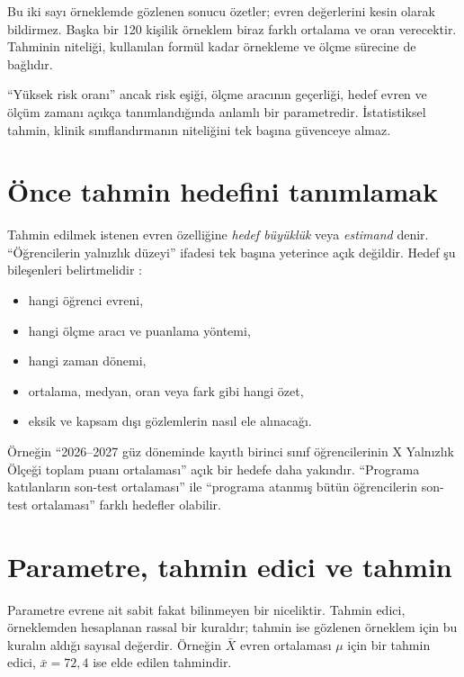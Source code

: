Bu iki sayı örneklemde gözlenen sonucu özetler; evren değerlerini kesin olarak
bildirmez. Başka bir 120 kişilik örneklem biraz farklı ortalama ve oran
verecektir. Tahminin niteliği, kullanılan formül kadar örnekleme ve ölçme
sürecine de bağlıdır.

\begin{researchbox}
``Yüksek risk oranı'' ancak risk eşiği, ölçme aracının geçerliği, hedef evren
ve ölçüm zamanı açıkça tanımlandığında anlamlı bir parametredir. İstatistiksel
tahmin, klinik sınıflandırmanın niteliğini tek başına güvenceye almaz.
\end{researchbox}

\section{Önce tahmin hedefini tanımlamak}

Tahmin edilmek istenen evren özelliğine \emph{hedef büyüklük} veya
\emph{estimand} denir. ``Öğrencilerin yalnızlık düzeyi'' ifadesi tek başına
yeterince açık değildir. Hedef şu bileşenleri belirtmelidir
\cite{casella2002,hogg2019}:

\begin{itemize}
  \item hangi öğrenci evreni,
  \item hangi ölçme aracı ve puanlama yöntemi,
  \item hangi zaman dönemi,
  \item ortalama, medyan, oran veya fark gibi hangi özet,
  \item eksik ve kapsam dışı gözlemlerin nasıl ele alınacağı.
\end{itemize}

Örneğin ``2026--2027 güz döneminde kayıtlı birinci sınıf öğrencilerinin X
Yalnızlık Ölçeği toplam puanı ortalaması'' açık bir hedefe daha yakındır.
``Programa katılanların son-test ortalaması'' ile ``programa atanmış bütün
öğrencilerin son-test ortalaması'' farklı hedefler olabilir.

\section{Parametre, tahmin edici ve tahmin}

Parametre evrene ait sabit fakat bilinmeyen bir niceliktir. Tahmin edici,
örneklemden hesaplanan rassal bir kuraldır; tahmin ise gözlenen örneklem için
bu kuralın aldığı sayısal değerdir. Örneğin $\bar X$ evren ortalaması $\mu$
için bir tahmin edici, $\bar x=72{,}4$ ise elde edilen tahmindir.

